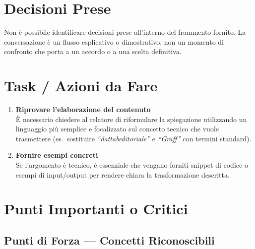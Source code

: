 \documentclass[12pt, a4paper]{article}
\begin{document}
\vspace{0.5cm}

\section{Decisioni Prese}

Non è possibile identificare decisioni prese all'interno del frammento fornito. La conversazione è un flusso esplicativo o dimostrativo, non un momento di confronto che porta a un accordo o a una scelta definitiva.

\vspace{0.5cm}

\section{Task / Azioni da Fare}

\begin{enumerate}[leftmargin=1.5cm, label=\textbf{\arabic*.}]

  \item \textbf{Riprovare l'elaborazione del contenuto}\\
  È necessario chiedere al relatore di riformulare la spiegazione utilizzando un linguaggio più semplice e focalizzato sul concetto tecnico che vuole trasmettere (es.\ sostituire \textit{``dattabeditoriale''} e \textit{``Graff''} con termini standard).

  \item \textbf{Fornire esempi concreti}\\
  Se l'argomento è tecnico, è essenziale che vengano forniti snippet di codice o esempi di input/output per rendere chiara la trasformazione descritta.

\end{enumerate}

\vspace{0.5cm}

\section{Punti Importanti o Critici}

\subsection{\textcolor{successgreen}{Punti di Forza — Concetti Riconoscibili}}
\end{document}
